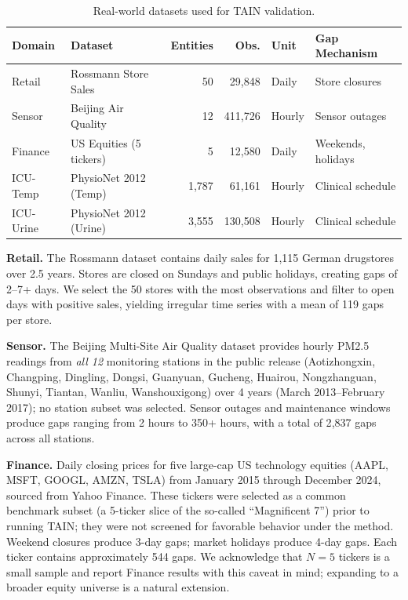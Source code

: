 \documentclass[11pt,a4paper]{article}
\begin{document}
\begin{table}[h]
\centering
\caption{Real-world datasets used for TAIN validation.}
\label{tab:datasets}
\begin{tabular}{llrrll}
\toprule
Domain & Dataset & Entities & Obs. & Unit & Gap Mechanism \\
\midrule
Retail & Rossmann Store Sales & 50 & 29{,}848 & Daily & Store closures \\
Sensor & Beijing Air Quality & 12 & 411{,}726 & Hourly & Sensor outages \\
Finance & US Equities (5 tickers) & 5 & 12{,}580 & Daily & Weekends, holidays \\
ICU-Temp & PhysioNet 2012 (Temp) & 1{,}787 & 61{,}161 & Hourly & Clinical schedule \\
ICU-Urine & PhysioNet 2012 (Urine) & 3{,}555 & 130{,}508 & Hourly & Clinical schedule \\
\bottomrule
\end{tabular}
\end{table}

\textbf{Retail.} The Rossmann dataset contains daily sales for 1{,}115 German
drugstores over 2.5 years. Stores are closed on Sundays and public holidays,
creating gaps of 2--7+ days. We select the 50 stores with the most observations
and filter to open days with positive sales, yielding irregular time series with
a mean of 119 gaps per store.

\textbf{Sensor.} The Beijing Multi-Site Air Quality dataset \citep{zhang2017cautionary}
provides hourly PM2.5 readings from \emph{all 12} monitoring stations in the
public release (Aotizhongxin, Changping, Dingling, Dongsi, Guanyuan, Gucheng,
Huairou, Nongzhanguan, Shunyi, Tiantan, Wanliu, Wanshouxigong) over 4 years
(March 2013--February 2017); no station subset was selected. Sensor outages
and maintenance windows produce gaps ranging from 2 hours to 350+ hours, with
a total of 2{,}837 gaps across all stations.

\textbf{Finance.} Daily closing prices for five large-cap US technology
equities (AAPL, MSFT, GOOGL, AMZN, TSLA) from January 2015 through
December 2024, sourced from Yahoo Finance. These tickers were selected as a
common benchmark subset (a 5-ticker slice of the so-called ``Magnificent 7'')
prior to running TAIN; they were not screened for favorable behavior under the
method. Weekend closures produce 3-day gaps; market holidays produce 4-day
gaps. Each ticker contains approximately 544 gaps. We acknowledge that
$N=5$ tickers is a small sample and report Finance results with this caveat
in mind; expanding to a broader equity universe is a natural extension.
\end{document}
